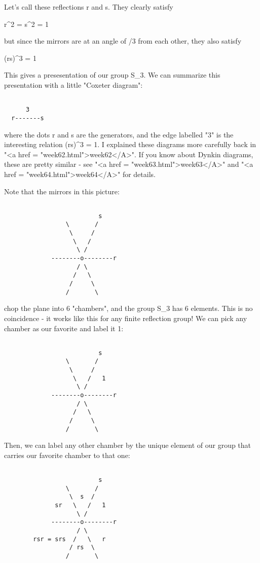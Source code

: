 Let's call these reflections r and s.  They clearly satisfy

r^{2} = s^{2} = 1

but since the mirrors are at an angle of \pi /3 from each other,
they also satisfy

(rs)^{3} = 1

This gives a presesentation of our group S_{3}.  We can summarize 
this presentation with a little "Coxeter diagram":
       

\begin{verbatim}

      3
  r-------s
\end{verbatim}
    

where the dots r and s are the generators, and the edge labelled
"3" is the interesting relation (rs)^{3} = 1.  I
explained these diagrams more carefully back in "<a href =
"week62.html">week62</A>".  If you know about Dynkin diagrams,
these are pretty similar - see "<a href =
"week63.html">week63</A>" and "<a href =
"week64.html">week64</A>" for details.

Note that the mirrors in this picture:


\begin{verbatim}

                          s 
                 \       /
                  \     /
                   \   /
                    \ /
             --------o--------r
                    / \
                   /   \
                  /     \
                 /       \
\end{verbatim}
    
chop the plane into 
6 "chambers", and the group S_{3} has 6
elements.  This is no coincidence - it works like this for any finite
reflection group!  We can pick any chamber as our favorite and label
it 1:


\begin{verbatim}

                          s 
                 \       /
                  \     /  
                   \   /   1
                    \ /
             --------o--------r
                    / \
                   /   \
                  /     \
                 /       \
\end{verbatim}
    
Then, we can label any other chamber by the unique element of
our group that carries our favorite chamber to that one:


\begin{verbatim}

                          s 
                 \       /
                  \  s  /     
              sr   \   /   1
                    \ /
             --------o--------r
                    / \
        rsr = srs  /   \   r
                  / rs  \  
                 /       \
\end{verbatim}
    
